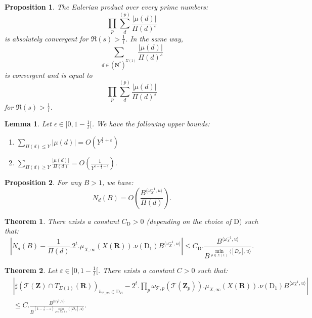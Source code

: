 \documentclass[10pt,a4paper]{amsart}
\newtheorem{prop}{Proposition}
\newtheorem{lemma}{Lemma}
\newtheorem{theorem}{Theorem}
\newcommand{\N}{\mathbf{N}}
\newcommand{\R}{\mathbf{R}}
\newcommand{\Z}{\mathbf{Z}}
\newcommand{\stackT}{\mathcal{T}}
\newcommand{\w}{\omega}
\begin{document}
\begin{prop}\label{value_global_mesure_mobius_fonction}
    The Eulerian product over every prime numbers:
    $$\prod\limits_p \sum\limits_{d}^{(p)} \frac{|\mu(d)|}{\Pi(d)^s}$$is absolutely convergent for $\Re(s) > \frac{1}{l}$. In the same way, $$\sum\limits_{d \in (\N^*)^{\Sigma(1)}} \frac{| \mu(d) |}{\Pi(d)^s} $$ is convergent and is equal to $$\prod\limits_p \sum\limits_{d}^{(p)} \frac{|\mu(d)|}{\Pi(d)^s}$$for $\Re(s) > \frac{1}{l}$.
\end{prop}

\begin{lemma}\label{majoration_fonction_de_mobius}
    Let $\epsilon \in ]0,1 - \frac{1}{l}[$. We have the following upper bounds:
    \begin{enumerate}
        \item $\sum\limits_{\Pi(d)\leqslant Y} |\mu(d)| = O\left( Y^{\frac{1}{l} + \varepsilon}\right)$
        \item $\sum\limits_{\Pi(d)\geqslant Y} \frac{| \mu(d) |}{\Pi(d)} = O\left( \frac{1}{Y^{1 - \frac{1}{l} - \epsilon}} \right).$
    \end{enumerate}
\end{lemma}

\begin{prop}\label{upper_bound_N_d(B)}
    For any $B > 1$, we have:
    $$N_d(B) = O\left( \frac{B^{\langle \w_{X}^{-1} , u \rangle}}{\Pi(d)} \right) .$$
\end{prop}

\begin{theorem}\label{estimation_N_d(B)}
    There exists a constant $C_{\mathrm{D}} > 0$ (depending on the choice of $\mathrm{D})$ such that:
    $$\left|  N_d(B) - \frac{1}{\Pi(d)}.2^t.\mu_{X,\infty}(X(\R)). \nu(\mathrm{D}_1) B^{ \langle \w_{X}^{-1} , u \rangle } \right| \leqslant C_{\mathrm{D}} .\frac{B^{\langle \w_X^{-1},u\rangle}}{B^{ \min\limits_{\rho \in \Sigma(1)} \langle [D_{\rho}],u\rangle } } .$$
\end{theorem}

\begin{theorem}
Let $\varepsilon \in ]0,1-\frac{1}{l}[$. There exists a constant $C > 0$ such that:
\begin{align*}
    &\left| \sharp( \stackT(\Z) \cap T_{\Sigma(1)}(\R) )_{h_{\stackT,\infty} \in \mathrm{D}_B} - 2^t . \prod\limits_p \w_{\stackT,p}(\stackT(\Z_p)) . \mu_{X,\infty}(X(\R)). \nu(\mathrm{D}_1) B^{ \langle \w_{X}^{-1} , u \rangle } \right| \\
    &\leqslant C . \frac{B^{\langle \w_{X}^{-1} , u \rangle}}{B^{(1 - \frac{1}{l} - \varepsilon) \min\limits_{\rho \in \Sigma(1)} \langle [D_{\rho}] , u \rangle }}.
\end{align*}
\end{theorem}
\end{document}
